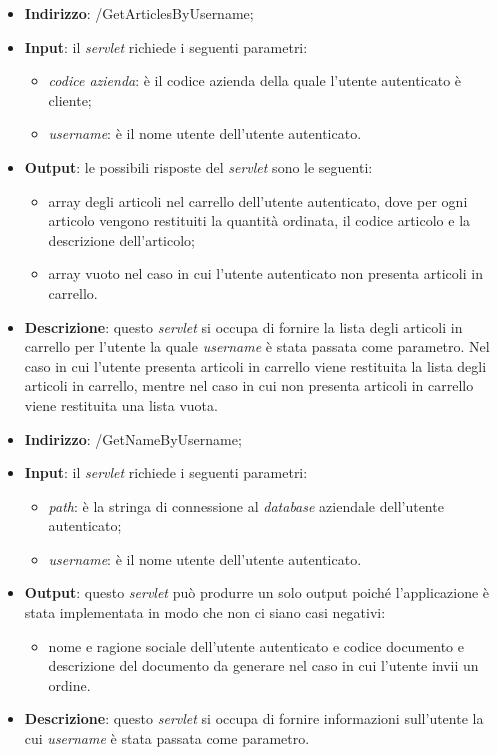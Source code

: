 
\begin{itemize}
	\item \textbf{Indirizzo}: /GetArticlesByUsername;
	\item \textbf{Input}: il \textit{servlet} richiede i seguenti parametri:
		\begin{itemize}
			\item \textit{codice azienda}: è il codice azienda della quale l'utente autenticato è cliente;
			\item \textit{username}: è il nome utente dell'utente autenticato.
		\end{itemize}
	\item \textbf{Output}: le possibili risposte del \textit{servlet} sono le seguenti:
		\begin{itemize}
			\item array degli articoli nel carrello dell'utente autenticato, dove per ogni articolo vengono restituiti la quantità ordinata, il codice articolo e la descrizione dell'articolo;
			\item array vuoto nel caso in cui l'utente autenticato non presenta articoli in carrello.
		\end{itemize}
	\item \textbf{Descrizione}: questo \textit{servlet} si occupa di fornire la lista degli articoli in carrello per l'utente la quale \textit{username} è stata passata come parametro. Nel caso in cui l'utente presenta articoli in carrello viene restituita la lista degli articoli in carrello, mentre nel caso in cui non presenta articoli in carrello viene restituita una lista vuota.
\end{itemize}


\begin{itemize}
	\item \textbf{Indirizzo}: /GetNameByUsername;
	\item \textbf{Input}: il \textit{servlet} richiede i seguenti parametri:
		\begin{itemize}
			\item \textit{path}: è la stringa di connessione al \textit{database} aziendale dell'utente autenticato;
			\item \textit{username}: è il nome utente dell'utente autenticato.
		\end{itemize}
	\item \textbf{Output}: questo \textit{servlet} può produrre un solo output poiché l'applicazione è stata implementata in modo che non ci siano casi negativi:
		\begin{itemize}
			\item nome e ragione sociale dell'utente autenticato e codice documento e descrizione del documento da generare nel caso in cui l'utente invii un ordine.
		\end{itemize}
	\item \textbf{Descrizione}: questo \textit{servlet} si occupa di fornire informazioni sull'utente la cui \textit{username} è stata passata come parametro.
\end{itemize}

